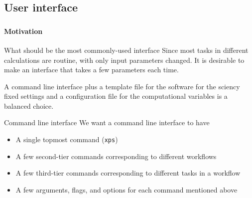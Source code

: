 \subsection{User interface}\label{ssec:ui}

\begin{frame}
    \frametitle{\subsecname}
    \framesubtitle{Motivation}

    \begin{block}{What should be the most commonly-used interface}
        Since most tasks in different \ab{} calculations are routine, with only
        input parameters changed. It is desirable to make an interface that takes a few
        parameters each time.

        A command line interface plus a template file for the \ab{} software for the sciency
        fixed settings and a configuration file for the computational variables is a
        balanced choice.
    \end{block}

    \begin{block}{Command line interface}
        We want a command line interface to have

        \begin{itemize}
            \item A single topmost command (\texttt{xps})
            \item A few second-tier commands corresponding to different workflows
            \item A few third-tier commands corresponding to different tasks in a workflow
            \item A few arguments, flags, and options for each command mentioned above
        \end{itemize}
    \end{block}
\end{frame}

